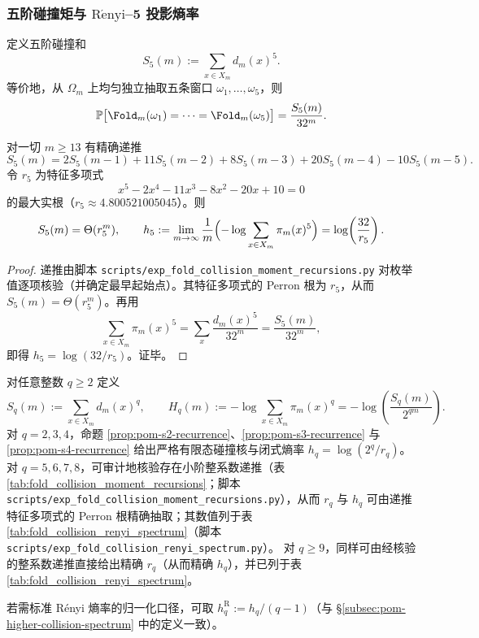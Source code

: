 


\subsubsection{五阶碰撞矩与 \texorpdfstring{$\mathrm{R\acute{e}nyi}$}{Renyi}--5 投影熵率}\label{subsec:pom-s5}
\begin{definition}[五阶折叠碰撞矩]\label{def:pom-s5}
定义五阶碰撞和
$$
S_5(m):=\sum_{x\in X_m} d_m(x)^5.
$$
等价地，从 \(\Omega_m\) 上均匀独立抽取五条窗口 \(\omega_1,\dots,\omega_5\)，则
$$
\mathbb{P}\bigl[\Fold_m(\omega_1)=\cdots=\Fold_m(\omega_5)\bigr]=\frac{S_5(m)}{32^m}.
$$
\end{definition}

\begin{proposition}\label{prop:pom-s5-recurrence}
对一切 \(m\ge 13\) 有精确递推
$$
S_5(m)=2S_5(m-1)+11S_5(m-2)+8S_5(m-3)+20S_5(m-4)-10S_5(m-5).
$$
令 \(r_5\) 为特征多项式
$$
x^5-2x^4-11x^3-8x^2-20x+10=0
$$
的最大实根（\(r_5\approx 4.800521005045\)）。则
$$
S_5(m)=\Theta(r_5^m),
\qquad
h_5:=\lim_{m\to\infty}\frac{1}{m}\Bigl(-\log\sum_{x\in X_m}\pi_m(x)^5\Bigr)
=\log\!\left(\frac{32}{r_5}\right).
$$
\end{proposition}
\begin{proof}
递推由脚本 \texttt{scripts/exp\_fold\_collision\_moment\_recursions.py} 对枚举值逐项核验（并确定最早起始点）。其特征多项式的 Perron 根为 \(r_5\)，从而 \(S_5(m)=\Theta(r_5^m)\)。再用
$$
\sum_{x\in X_m}\pi_m(x)^5=\sum_x\frac{d_m(x)^5}{32^m}=\frac{S_5(m)}{32^m},
$$
即得 \(h_5=\log(32/r_5)\)。证毕。
\end{proof}

\begin{remark}[\texorpdfstring{$\mathrm{R\acute{e}nyi}$}{Renyi} 指纹谱：从 \texorpdfstring{$q=2,3$}{q=2,3} 到更高阶]\label{rem:pom-renyi-spectrum}
对任意整数 \(q\ge 2\) 定义
$$
S_q(m):=\sum_{x\in X_m} d_m(x)^q,\qquad
H_q(m):=-\log\sum_{x\in X_m}\pi_m(x)^q=-\log\!\left(\frac{S_q(m)}{2^{qm}}\right).
$$
对 \(q=2,3,4\)，命题 \ref{prop:pom-s2-recurrence}、\ref{prop:pom-s3-recurrence} 与 \ref{prop:pom-s4-recurrence} 给出严格有限态碰撞核与闭式熵率 \(h_q=\log(2^q/r_q)\)。
对 \(q=5,6,7,8\)，可审计地核验存在小阶整系数递推（表 \ref{tab:fold_collision_moment_recursions}；脚本 \texttt{scripts/exp\_fold\_collision\_moment\_recursions.py}），从而 \(r_q\) 与 \(h_q\) 可由递推特征多项式的 Perron 根精确抽取；其数值列于表 \ref{tab:fold_collision_renyi_spectrum}（脚本 \texttt{scripts/exp\_fold\_collision\_renyi\_spectrum.py}）。
对 \(q\ge 9\)，同样可由经核验的整系数递推直接给出精确 \(r_q\)（从而精确 \(h_q\)），并已列于表 \ref{tab:fold_collision_renyi_spectrum}。
\par
若需标准 Rényi 熵率的归一化口径，可取 \(h_q^{\mathrm{R}}:=h_q/(q-1)\)（与 \S\ref{subsec:pom-higher-collision-spectrum} 中的定义一致）。
\end{remark}

